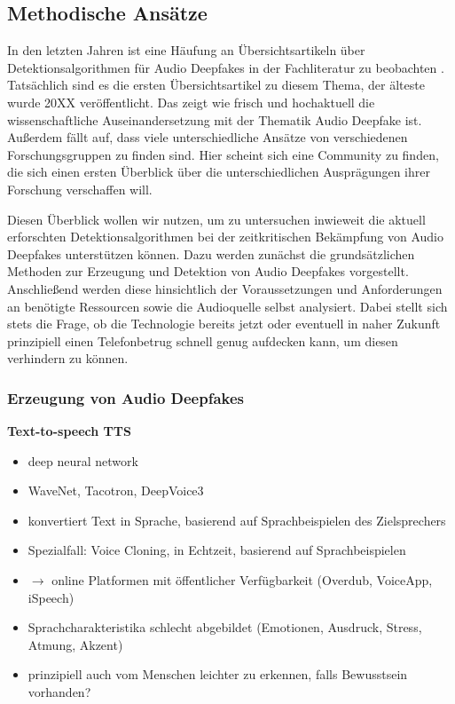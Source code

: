 \subsection{Methodische Ansätze}
In den letzten Jahren ist eine Häufung an Übersichtsartikeln über Detektionsalgorithmen für Audio Deepfakes in der Fachliteratur zu beobachten \citep[][]{Masood2022,Almutairi2022,Khanjani2021}.
Tatsächlich sind es die ersten Übersichtsartikel zu diesem Thema, der älteste wurde 20XX veröffentlicht. %
Das zeigt wie frisch und hochaktuell die wissenschaftliche Auseinandersetzung mit der Thematik Audio Deepfake ist.
Außerdem fällt auf, dass viele unterschiedliche Ansätze von verschiedenen Forschungsgruppen zu finden sind.
Hier scheint sich eine Community zu finden, die sich einen ersten Überblick über die unterschiedlichen Ausprägungen ihrer Forschung verschaffen will.

Diesen Überblick wollen wir nutzen, um zu untersuchen inwieweit die aktuell erforschten Detektionsalgorithmen bei der zeitkritischen Bekämpfung von Audio Deepfakes unterstützen können.
Dazu werden zunächst die grundsätzlichen Methoden zur Erzeugung und Detektion von Audio Deepfakes vorgestellt.
Anschließend werden diese hinsichtlich der Voraussetzungen und Anforderungen an benötigte Ressourcen sowie die Audioquelle selbst analysiert.
Dabei stellt sich stets die Frage, ob die Technologie bereits jetzt oder eventuell in naher Zukunft prinzipiell einen Telefonbetrug schnell genug aufdecken kann, um diesen verhindern zu können.

\subsubsection{Erzeugung von Audio Deepfakes}
\textbf{Text-to-speech TTS} \citep[][]{Masood2022}
\begin{itemize}
  \item deep neural network
  \item WaveNet, Tacotron, DeepVoice3
  \item konvertiert Text in Sprache, basierend auf Sprachbeispielen des Zielsprechers
  \item Spezialfall: Voice Cloning, in Echtzeit, basierend auf Sprachbeispielen
  \item $\rightarrow$ online Platformen mit öffentlicher Verfügbarkeit (Overdub, VoiceApp, iSpeech)
  \item Sprachcharakteristika schlecht abgebildet (Emotionen, Ausdruck, Stress, Atmung, Akzent)
  \item prinzipiell auch vom Menschen \glqq{}leichter\grqq{} zu erkennen, falls Bewusstsein vorhanden?
\end{itemize}

